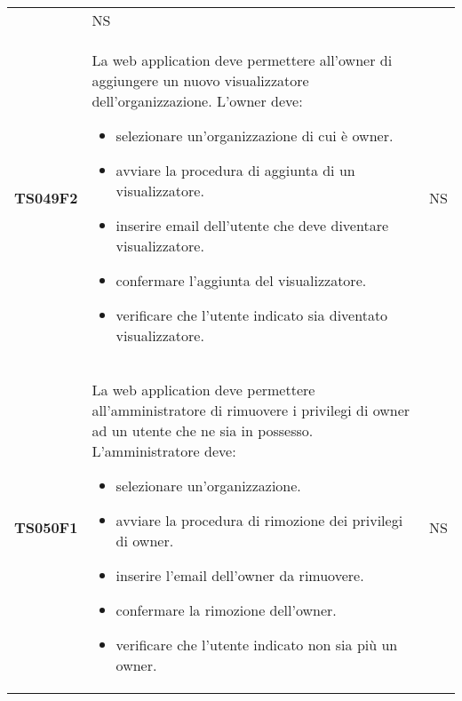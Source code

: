 \documentclass[../piano-di-qualifica.tex]{subfiles}
\begin{document}
\begin{longtable}[H]{>{\centering\bfseries}m{3cm} >{}m{10cm} >{\centering\arraybackslash}m{3cm}}
                     & NS                                                                                                                                                                                                                                                               \\
  TS049F2            & La web application deve permettere all'owner di aggiungere un nuovo visualizzatore dell'organizzazione. \newline
  L'owner deve:
  \begin{itemize}
    \item selezionare un'organizzazione di cui è owner.
    \item avviare la procedura di aggiunta di un visualizzatore.
    \item inserire email dell'utente che deve diventare visualizzatore.
    \item confermare l'aggiunta del visualizzatore.
    \item verificare che l'utente indicato sia diventato visualizzatore.
  \end{itemize}
                     & NS                                                                                                                                                                                                                                                               \\
  TS050F1            & La web application deve permettere all'amministratore di rimuovere i privilegi di owner ad un utente che ne sia in possesso. \newline
  L'amministratore deve:
  \begin{itemize}
    \item selezionare un'organizzazione.
    \item avviare la procedura di rimozione dei privilegi di owner.
    \item inserire l'email dell'owner da rimuovere.
    \item confermare la rimozione dell'owner.
    \item verificare che l'utente indicato non sia più un owner.
  \end{itemize}
                     & NS                                                                                                                                                                                                                                                               \\

\end{longtable}
\end{document}
